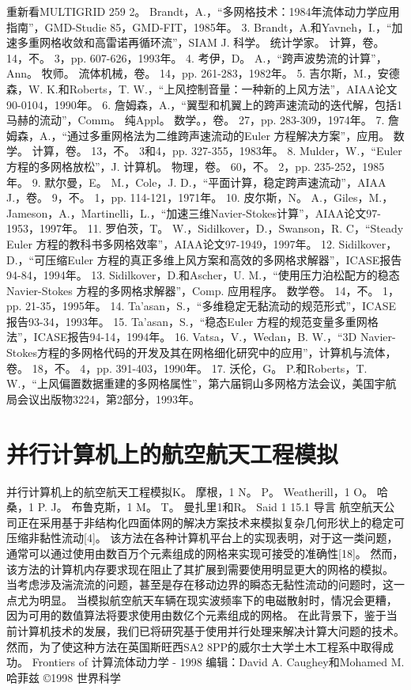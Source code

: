 \documentclass[UTF8,11pt,a4paper,openany,fontset=fandol]{ctexbook}
\begin{document}
重新看MULTIGRID 259 2。 Brandt，A.，“多网格技术：1984年流体动力学应用指南”，GMD-Studie 85，GMD-FIT，1985年。 3. Brandt，A.和Yavneh，I.，“加速多重网格收敛和高雷诺再循环流”，SIAM J. 科学。 统计学家。 计算，卷。 14，不。 3，pp. 607-626，1993年。 4. 考伊，D。 A.，“跨声波势流的计算”，Ann。 牧师。 流体机械，卷。 14，pp. 261-283，1982年。 5. 吉尔斯，M.，安德森，W. K.和Roberts，T. W.，“上风控制音量：一种新的上风方法”，AIAA论文90-0104，1990年。 6. 詹姆森，A.，“翼型和机翼上的跨声速流动的迭代解，包括1马赫的流动”，Comm。 纯Appl。 数学。，卷。 27，pp. 283-309，1974年。 7. 詹姆森，A.，“通过多重网格法为二维跨声速流动的Euler 方程解决方案”，应用。 数学。 计算，卷。 13，不。 3和4，pp. 327-355，1983年。 8. Mulder，W.，“Euler 方程的多网格放松”，J. 计算机。 物理，卷。 60，不。 2，pp. 235-252，1985年。 9. 默尔曼，E。 M.，Cole，J. D.，“平面计算，稳定跨声速流动”，AIAA J.，卷。 9，不。 1，pp. 114-121，1971年。 10. 皮尔斯，N。 A.，Giles，M.，Jameson，A.，Martinelli，L.，“加速三维Navier-Stokes计算”，AIAA论文97-1953，1997年。 11. 罗伯茨，T。 W.，Sidilkover，D.，Swanson，R. C，“Steady Euler 方程的教科书多网格效率”，AIAA论文97-1949，1997年。 12. Sidilkover，D.，“可压缩Euler 方程的真正多维上风方案和高效的多网格求解器”，ICASE报告94-84，1994年。 13. Sidilkover，D.和Ascher，U. M.，“使用压力泊松配方的稳态Navier-Stokes 方程的多网格求解器”，Comp. 应用程序。 数学卷。 14，不。 1，pp. 21-35，1995年。 14. Ta'asan，S.，“多维稳定无黏流动的规范形式”，ICASE报告93-34，1993年。 15. Ta'asan，S.，“稳态Euler 方程的规范变量多重网格法”，ICASE报告94-14，1994年。 16. Vatsa，V.，Wedan，B. W.，“3D Navier-Stokes方程的多网格代码的开发及其在网格细化研究中的应用”，计算机与流体，卷。 18，不。 4，pp. 391-403，1990年。 17. 沃伦，G。 P.和Roberts，T. W.，“上风偏置数据重建的多网格属性”，第六届铜山多网格方法会议，美国宇航局会议出版物3224，第2部分，1993年。

\clearpage
\chapter{并行计算机上的航空航天工程模拟}
并行计算机上的航空航天工程模拟K。 摩根，1 N。 P。 Weatherill，1 O。 哈桑，1 P. J。 布鲁克斯，1 M。 T。 曼扎里1和R。 Said 1 15.1 导言 航空航天公司正在采用基于非结构化四面体网的解决方案技术来模拟复杂几何形状上的稳定可压缩非黏性流动[4]。 该方法在各种计算机平台上的实现表明，对于这一类问题，通常可以通过使用由数百万个元素组成的网格来实现可接受的准确性[18]。 然而，该方法的计算机内存要求现在阻止了其扩展到需要使用明显更大的网格的模拟。 当考虑涉及湍流流的问题，甚至是存在移动边界的瞬态无黏性流动的问题时，这一点尤为明显。 当模拟航空航天车辆在现实波频率下的电磁散射时，情况会更糟，因为可用的数值算法将要求使用由数亿个元素组成的网格。 在此背景下，鉴于当前计算机技术的发展，我们已将研究基于使用并行处理来解决计算大问题的技术。 然而，为了使这种方法在英国斯旺西SA2 8PP的威尔士大学土木工程系中取得成功。 Frontiers of 计算流体动力学 - 1998 编辑：David A. Caughey和Mohamed M. 哈菲兹 ©1998 世界科学
\end{document}
